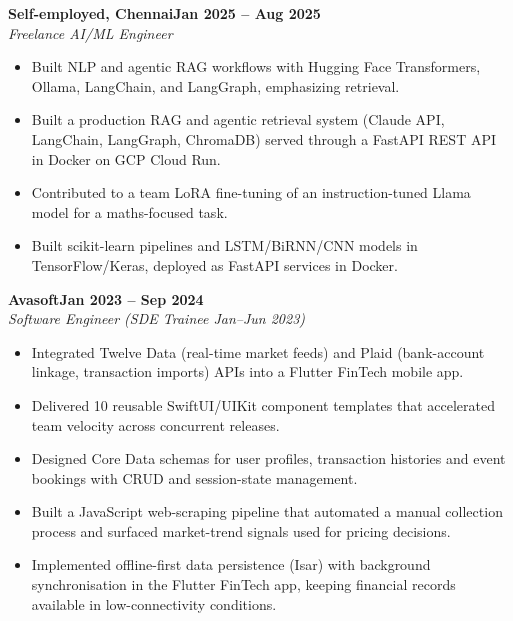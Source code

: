 \documentclass[a4paper,11pt]{article}
\newcommand{\entry}[4]{\needspace{4\baselineskip}\noindent\textbf{#1}\hfill\textbf{#2}\\ \textit{#3}\hfill\textit{#4}\par}
\begin{document}
\vspace{4pt}
\entry{Self-employed, Chennai}{Jan 2025 – Aug 2025}{Freelance AI/ML Engineer}{}
\begin{itemize}
  \item Built NLP and agentic RAG workflows with Hugging Face Transformers, Ollama, LangChain, and LangGraph, emphasizing retrieval.
  \item Built a production RAG and agentic retrieval system (Claude API, LangChain, LangGraph, ChromaDB) served through a FastAPI REST API in Docker on GCP Cloud Run.
  \item Contributed to a team LoRA fine-tuning of an instruction-tuned Llama model for a maths-focused task.
  \item Built scikit-learn pipelines and LSTM/BiRNN/CNN models in TensorFlow/Keras, deployed as FastAPI services in Docker.
\end{itemize}
\vspace{4pt}
\entry{Avasoft}{Jan 2023 – Sep 2024}{Software Engineer (SDE Trainee Jan–Jun 2023)}{}
\begin{itemize}
  \item Integrated Twelve Data (real-time market feeds) and Plaid (bank-account linkage, transaction imports) APIs into a Flutter FinTech mobile app.
  \item Delivered 10 reusable SwiftUI/UIKit component templates that accelerated team velocity across concurrent releases.
  \item Designed Core Data schemas for user profiles, transaction histories and event bookings with CRUD and session-state management.
  \item Built a JavaScript web-scraping pipeline that automated a manual collection process and surfaced market-trend signals used for pricing decisions.
  \item Implemented offline-first data persistence (Isar) with background synchronisation in the Flutter FinTech app, keeping financial records available in low-connectivity conditions.
\end{itemize}

\end{document}
